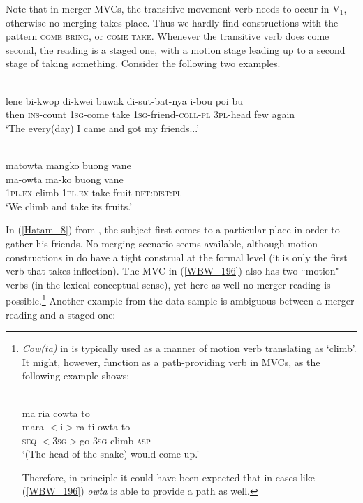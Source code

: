 Note that in merger MVCs, the transitive movement verb needs to occur in V$_1$, otherwise no merging takes place. Thus we hardly find constructions with the pattern \textsc{come} \textsc{bring}, or \textsc{come} \textsc{take}. Whenever the transitive verb does come second, the reading is a staged one, with a motion stage leading up to a second stage of taking something. Consider the following two examples.

\ea \label{Hatam_8}
\\
\gll lene bi-kwop di-kwei buwak di-sut-bat-nya i-bou poi bu \\
then \textsc{ins}-count 1\textsc{sg}-come take 1\textsc{sg}-friend-\textsc{coll}-\textsc{pl} 3\textsc{pl}-head few again \\
\glft `The every(day) I came and got my friends...' \\ 
\z

\ea \label{WBW_196} 
\\
\glll matowta mangko buong vane \\
ma-owta ma-ko buong vane \\
1\textsc{pl}.\textsc{ex}-climb 1\textsc{pl}.\textsc{ex}-take fruit \textsc{det}:\textsc{dist}:\textsc{pl}\\
\glft `We climb and take its fruits.' \\ 
\z

\largerpage[1]
In (\ref{Hatam_8}) from , the subject first comes to a particular place in order to gather his friends. No merging scenario seems available, although motion constructions in  do have a tight construal at the formal level (it is only the first verb that takes inflection). The  MVC in (\ref{WBW_196}) also has two ``motion" verbs (in the lexical-conceptual sense), yet here as well no merger reading is possible.\footnote{\textit{Cow(ta)} in  is typically used as a manner of motion verb translating as `climb'. It might, however, function as a path-providing verb in MVCs, as the following example shows:

\ea 
{}\\
\glll ma ria cowta to \\
mara $<$i$>$ra ti-owta to \\
\textsc{seq} $<$3\textsc{sg}$>$go 3\textsc{sg}-climb \textsc{asp}\\
\glft `(The head of the snake) would come up.'\\ 
\z

Therefore, in principle it could have been expected that in cases like (\ref{WBW_196}) \textit{owta} is able to provide a path as well.} Another example from the data sample is ambiguous between a merger reading and a staged one:
 
